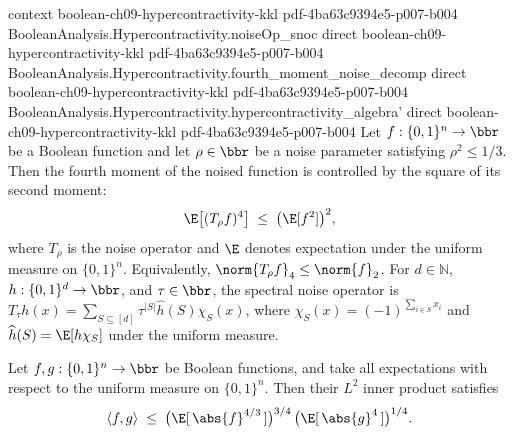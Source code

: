 \begin{theorem}
  {context}
  {boolean-ch09-hypercontractivity-kkl}
  {pdf-4ba63c9394e5-p007-b004}
\proofstep
  {BooleanAnalysis.Hypercontractivity.noiseOp_snoc}
  {direct}
  {boolean-ch09-hypercontractivity-kkl}
  {pdf-4ba63c9394e5-p007-b004}
\proofstep
  {BooleanAnalysis.Hypercontractivity.fourth_moment_noise_decomp}
  {direct}
  {boolean-ch09-hypercontractivity-kkl}
  {pdf-4ba63c9394e5-p007-b004}
\proofstep
  {BooleanAnalysis.Hypercontractivity.hypercontractivity_algebra'}
  {direct}
  {boolean-ch09-hypercontractivity-kkl}
  {pdf-4ba63c9394e5-p007-b004}
Let $f:\{0,1\}^n\to\bbr$ be a Boolean function and let $\rho\in\bbr$ be a noise
parameter satisfying $\rho^2\le 1/3$. Then the fourth moment of the noised function is
controlled by the square of its second moment:
\[
  \E\bigl[(T_\rho f)^4\bigr]\;\le\;\bigl(\E[f^2]\bigr)^2,
\]
where $T_\rho$ is the noise operator and $\E$ denotes expectation under the uniform
measure on $\{0,1\}^n$. Equivalently, $\norm{T_\rho f}_4\le\norm{f}_2$. For $d\in\mathbb
N$, $h:\{0,1\}^d\to\bbr$, and $\tau\in\bbr$, the spectral noise operator is $T_\tau
h(x)=\sum_{S\subseteq[d]}\tau^{|S|}\widehat h(S)\chi_S(x)$, where
$\chi_S(x)=(-1)^{\sum_{i\in S}x_i}$ and $\widehat h(S)=\E[h\chi_S]$ under the uniform
measure.
\end{theorem}

\begin{lemma}
\leanok
{}
\label{BooleanAnalysis.Hypercontractivity.innerProduct_le_L43_L4}
Let $f, g : \{0,1\}^n \to \bbr$ be Boolean functions, and take all expectations with
respect to the uniform measure on $\{0,1\}^n$. Then their $L^2$ inner product satisfies
\[
  \langle f, g \rangle
  \;\le\;
  \bigl(\E[\,\abs{f}^{4/3}\,]\bigr)^{3/4}\,
  \bigl(\E[\,\abs{g}^{4}\,]\bigr)^{1/4}.
\]
\end{lemma}

